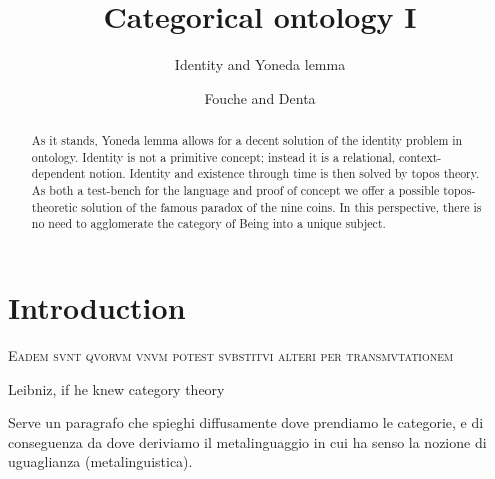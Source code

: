 \documentclass{amsart}
\author{Fouche and Denta}
\title{Categorical ontology I}
\subtitle{Identity and Yoneda lemma}
\begin{document}
\maketitle
\begin{abstract}
  As it stands, Yoneda lemma allows for a decent solution of the identity problem in ontology. Identity is not a primitive concept; instead it is a relational, context-dependent notion. Identity and existence through time is then solved by topos theory. As both a test-bench for the language and proof of concept we offer a possible topos-theoretic solution of the famous paradox of the nine coins. In this perspective, there is no need to agglomerate the category of Being into a unique subject.
\end{abstract}
\section{Introduction}
\epigraph{\textsc{Eadem svnt qvorvm vnvm potest svbstitvi alteri per transmvtationem}}{Leibniz, if he knew category theory}
Serve un paragrafo che spieghi diffusamente dove prendiamo le categorie, e di conseguenza da dove deriviamo il metalinguaggio in cui ha senso la nozione di uguaglianza (metalinguistica).
\end{document}
